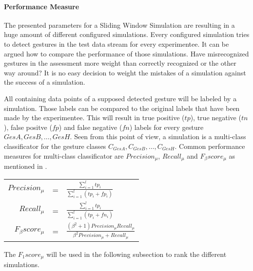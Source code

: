 \paragraph{Performance Measure} \label{performance_measure}
The presented parameters for a Sliding Window Simulation are resulting in a huge amount of different configured
simulations. Every configured simulation tries to detect gestures in the test data stream for every experimentee. It can
be argued how to compare the performance of those simulations. Have misrecognized gestures in the assessment more weight
than correctly recognized or the other way around? It is no easy decision to weight the mistakes of a simulation against
the success of a simulation.

All containing data points of a supposed detected gesture will be labeled by a simulation. Those labels can be compared
to the original labels that have been made by the experimentee. This will result in true positive ($tp$), true negative
($tn$), false positve ($fp$) and false negative ($fn$) labels for every gesture $GesA, GesB, \dots, GesH$. Seen from
this point of view, a simulation is a multi-class classificator for the gesture classes
$C_{GesA}, C_{GesB}, \dots, C_{GesH}$. Common performance measures for multi-class classificator are $Precision_{\mu}$,
$Recall_{\mu}$ and $F_{\beta}score_{\mu}$ as mentioned in \cite{sokolova2009systematic}.

\begin{center}
    \begin{tabular}{r c l}
        $Precision_{\mu}$ & = &  $\frac{\sum \limits_{i=1}^{l} tp_i}{\sum \limits_{i=1}^{l} (tp_i + fp_i)}$ \\
        $Recall_{\mu}$ & = & $\frac{\sum \limits_{i=1}^{l} tp_i}{\sum \limits_{i=1}^{l} (tp_i + fn_i)}$ \\
        $F_{\beta}score_{\mu}$ & = & $\frac{(\beta^2 + 1)Precision_{\mu} Recall_{\mu}}{\beta^2 Precision_{\mu} + Recall_{\mu}}$
    \end{tabular}
\end{center}

The $F_{1}score_{\mu}$ will be used in the following subsection to rank the different simulations.
